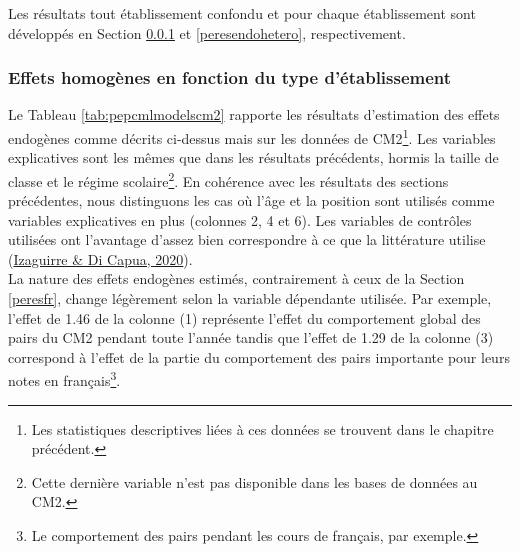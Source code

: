 \documentclass[
]{book}
\begin{document}
\quad Les résultats tout établissement confondu et pour chaque établissement sont développés en Section \ref{peresendohomo} et \ref{peresendohetero}, respectivement.

\hypertarget{peresendohomo}{%
\subsubsection{Effets homogènes en fonction du type d'établissement}\label{peresendohomo}}

Le Tableau \ref{tab:pepcmlmodelscm2} rapporte les résultats d'estimation des effets endogènes comme décrits ci-dessus mais sur les données de CM2\footnote{Les statistiques descriptives liées à ces données se trouvent dans le chapitre précédent.}. Les variables explicatives sont les mêmes que dans les résultats précédents, hormis la taille de classe et le régime scolaire\footnote{Cette dernière variable n'est pas disponible dans les bases de données au CM2.}. En cohérence avec les résultats des sections précédentes, nous distinguons les cas où l'âge et la position sont utilisés comme variables explicatives en plus (colonnes 2, 4 et 6). Les variables de contrôles utilisées ont l'avantage d'assez bien correspondre à ce que la littérature utilise (\protect\hyperlink{ref-IZA:DIC:20}{Izaguirre \& Di Capua, 2020}).\\
La nature des effets endogènes estimés, contrairement à ceux de la Section \ref{peresfr}, change légèrement selon la variable dépendante utilisée. Par exemple, l'effet de 1.46 de la colonne (1) représente l'effet du comportement global des pairs du CM2 pendant toute l'année tandis que l'effet de 1.29 de la colonne (3) correspond à l'effet de la partie du comportement des pairs importante pour leurs notes en français\footnote{Le comportement des pairs pendant les cours de français, par exemple.}.
\end{document}

